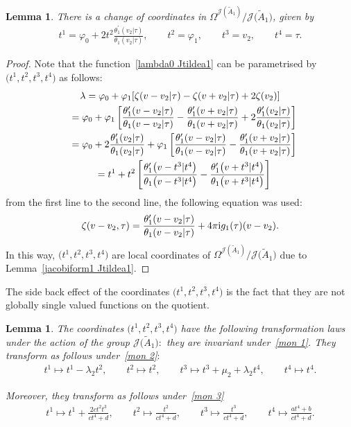 \documentclass[10pt,a4paper]{amsart}
\numberwithin{equation}{section}
\newtheorem{Lemma}[Theorem]{Lemma}
\newcommand{\Ja}{\mathcal{J}}
\begin{document}
\begin{Lemma}
There is a change of coordinates in $\Omega^{\Ja(\tilde A_1)}/\Ja\big(\tilde A_1\big)$, given by
\begin{gather*}
t^1=\varphi_0+2t^2\frac{\theta_1^{\prime}(v_2|\tau)}{\theta_1(v_2|\tau)},\qquad
t^2=\varphi_1,\qquad
t^3=v_2,\qquad
t^4=\tau.
\end{gather*}
\end{Lemma}
\begin{proof}
Note that the function~\eqref{lambda0 Jtildea1} can be parametrised by $\big(t^1,t^2,t^3,t^4\big)$ as follows:
\begin{gather*}
\lambda=\varphi_0+\varphi_1[\zeta(v-v_2|\tau)-\zeta(v+v_2|\tau)+2\zeta(v_2)]
\\ \hphantom{\lambda}
{}=\varphi_0+\varphi_1\left[\frac{\theta_1^{\prime}(v-v_2|\tau)}{\theta_1(v-v_2|\tau)} -\frac{\theta_1^{\prime}(v+v_2|\tau)}{\theta_1(v+v_2|\tau)} +2\frac{\theta_1^{\prime}(v_2|\tau)}{\theta_1(v_2|\tau)}\right]
\\ \hphantom{\lambda}
{}=\varphi_0+2\frac{\theta_1^{\prime}(v_2|\tau)}{\theta_1(v_2|\tau)} +\varphi_1\left[\frac{\theta_1^{\prime}(v-v_2|\tau)}{\theta_1(v-v_2|\tau)} -\frac{\theta_1^{\prime}(v+v_2|\tau)}{\theta_1(v+v_2|\tau)}\right]
\\ \hphantom{\lambda}
{}=t^1+t^2\left[\frac{\theta_1^{\prime}\big(v-t^3|t^4\big)}{\theta_1\big(v-t^3|t^4\big)} -\frac{\theta_1^{\prime}\big(v+t^3|t^4\big)}{\theta_1\big(v+t^3|t^4\big)}\right]
\end{gather*}
from the first line to the second line, the following equation was used:
\begin{gather*}
\zeta(v-v_2,\tau)=\frac{\theta_1^{\prime}(v-v_2|\tau)}{\theta_1(v-v_2|\tau)}+4\pi {\rm i}g_1(\tau)(v-v_2).
\end{gather*}
 In this way, $\big(t^1,t^2,t^3,t^4\big)$ are local coordinates of $\Omega^{\Ja(\tilde A_1)}/\Ja\big(\tilde A_1\big)$ due to Lemma~\ref{jacobiform1 Jtildea1}.
\end{proof}

The side back effect of the coordinates $\big(t^1,t^2,t^3,t^4\big)$ is the fact that they are not globally single valued functions on the quotient.

\begin{Lemma}%
The coordinates $\big(t^1,t^2,t^3,t^4\big)$ have the following transformation laws under the action of the group $\Ja\big(\tilde A_1\big){:}$ they are invariant under~\eqref{mon 1}.
They transform as follows under~\eqref{mon 2}$:$
\begin{gather*}
t^1\mapsto t^1-\lambda_2t^2,\qquad
t^2\mapsto t^2,\qquad
t^3\mapsto t^3+\mu_2+\lambda_2t^4,\qquad
t^4\mapsto t^4.
\end{gather*}

Moreover, they transform as follows under~\eqref{mon 3}
\begin{gather*}
t^1\mapsto t^1+\frac{2ct^2t^3}{ct^4+d},\qquad
t^2\mapsto \frac{t^2}{ct^4+d},\qquad
t^3\mapsto \frac{t^3}{ct^4+d},\qquad
t^4\mapsto \frac{at^4+b}{ct^4+d}.
\end{gather*}
\end{Lemma}
\end{document}
